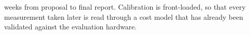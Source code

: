 %
\begin{table}[!t]
\centering
\caption{ \timelineWeeksNum{} weeks from
proposal to final report. Calibration is front-loaded, so that every
measurement taken later is read through a cost model that has already been
validated against the evaluation hardware.}
\label{tab:timeline}
%
\end{table}
